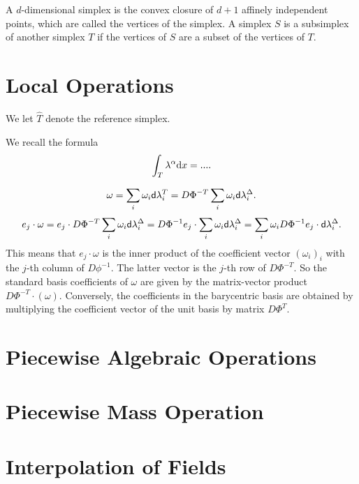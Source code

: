 \documentclass[letterpaper,10pt,draft]{amsart}
\begin{document}
A $d$-dimensional simplex is the convex closure of $d+1$ affinely independent points,
which are called the vertices of the simplex. 
A simplex $S$ is a subsimplex of another simplex $T$ 
if the vertices of $S$ are a subset of the vertices of $T$.

\section{Local Operations}

We let $\hat T$ denote the reference simplex. 

We recall the formula 
\begin{align*}
 \int_{T} \lambda^{\alpha} {\mathrm d} x = ....
\end{align*}

\begin{align*}
 \omega
 = 
 \sum_{i} \omega_{i} {\mathsf d}\lambda^{T}_{i}
 = 
 D\Phi^{-T} \sum_{i} \omega_{i} {\mathsf d}\lambda^{\Delta}_{i}
 .
\end{align*}
\begin{align*}
 e_{j} \cdot \omega
 = 
 e_{j} \cdot D\Phi^{-T} \sum_{i} \omega_{i} {\mathsf d}\lambda^{\Delta}_{i}
 = 
 D\Phi^{-1} e_{j} \cdot \sum_{i} \omega_{i} {\mathsf d}\lambda^{\Delta}_{i}
 = 
 \sum_{i} \omega_{i} D\Phi^{-1} e_{j} \cdot {\mathsf d}\lambda^{\Delta}_{i}
 .
\end{align*}
This means that $e_{j} \cdot \omega$ is the inner product of the coefficient vector 
$(\omega_{i})_{i}$ with the $j$-th column of $D\phi^{-1}$.
The latter vector is the $j$-th row of $D\Phi^{-T}$.
So the standard basis coefficients of $\omega$ are given by 
the matrix-vector product $D\Phi^{-T} \cdot (\omega)$.
Conversely, the coefficients in the barycentric basis 
are obtained by multiplying the coefficient vector of the unit basis 
by matrix $D\Phi^{T}$.

\section{Piecewise Algebraic Operations}

\section{Piecewise Mass Operation}

\section{Interpolation of Fields}
\end{document}
